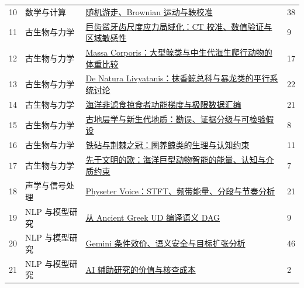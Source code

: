 \documentclass[UTF8,fontset=fandol,10pt,a4paper]{ctexart}
\begin{document}
\begin{longtable}{@{}R{7mm}L{25mm}L{\dimexpr\linewidth-43mm-6\tabcolsep\relax}R{11mm}@{}}
10 & 数学与计算 & \href{https://chatgpt.com/library?file_id=libfile_2227c3b73f8081918b58830ee0bca786&account_id=personal}{随机游走、Brownian 运动与鞅校准} & 38 \\
11 & 古生物与力学 & \href{https://chatgpt.com/library?file_id=libfile_e8de70bc5034819180f2a175864bcb1f&account_id=personal}{巨齿鲨牙齿尺度应力局域化：CT 校准、数值验证与区域敏感性} & 9 \\
12 & 古生物与力学 & \href{https://chatgpt.com/library?file_id=libfile_4fb7785fd23c819193e92aeab35dc9ad&account_id=personal}{Massa Corporis：大型鲸类与中生代海生爬行动物的体重比较} & 17 \\
13 & 古生物与力学 & \href{https://chatgpt.com/library?file_id=libfile_04fb713015e48191b20fd60d2b25b4c7&account_id=personal}{De Natura Livyatanis：抹香鲸总科与暴龙类的平行系统讨论} & 22 \\
14 & 古生物与力学 & \href{https://chatgpt.com/library?file_id=libfile_8a7734085c048191ba0ca011d234cd3f&account_id=personal}{海洋非滤食掠食者功能梯度与极限数据汇编} & 21 \\
15 & 古生物与力学 & \href{https://chatgpt.com/library?file_id=libfile_e517125ea0748191b7d880689b64bc07&account_id=personal}{古地层学与新生代地质：勘误、证据分级与可检验假设} & 8 \\
16 & 古生物与力学 & \href{https://chatgpt.com/library?file_id=libfile_0a1035200aac819194e799736d879d52&account_id=personal}{铁砧与荆棘之冠：圈养鲸类的生理与认知约束} & 11 \\
17 & 古生物与力学 & \href{https://chatgpt.com/library?file_id=libfile_0547a5d339ec8191a67a49721d168c3c&account_id=personal}{先于文明的歌：海洋巨型动物智能的能量、认知与介质约束} & 7 \\
18 & 声学与信号处理 & \href{https://chatgpt.com/library?file_id=libfile_682f0956c4648191a4865aa0f870486d&account_id=personal}{Physeter Voice：STFT、频带能量、分段与节奏分析} & 21 \\
19 & NLP 与模型研究 & \href{https://chatgpt.com/library?file_id=libfile_3bb5a969488c8191bf8a5679e80ea107&account_id=personal}{从 Ancient Greek UD 编译语义 DAG} & 9 \\
20 & NLP 与模型研究 & \href{https://chatgpt.com/library?file_id=libfile_7800df5c2518819182d8d5d9f54f84be&account_id=personal}{Gemini 条件效价、语义安全与目标扩张分析} & 46 \\
21 & NLP 与模型研究 & \href{https://chatgpt.com/library?file_id=libfile_62d5ebf30e388191b510465799793cad&account_id=personal}{AI 辅助研究的价值与核查成本} & 2 \\

\end{longtable}
\end{document}
